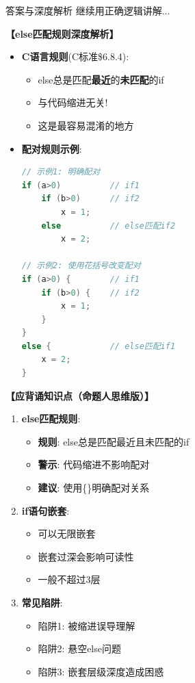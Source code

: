 \documentclass[a4paper,12pt]{article}
\begin{document}
\begin{bluebox}{答案与深度解析}
	继续用正确逻辑讲解...

	\textbf{【else匹配规则深度解析】}

	\begin{itemize}[leftmargin=*, nosep]
		\item \textbf{C语言规则}(C标准\$6.8.4):
		      \begin{itemize}
			      \item else总是匹配\textbf{最近}的\textbf{未匹配}的if
			      \item 与代码缩进无关!
			      \item 这是最容易混淆的地方
		      \end{itemize}

		\item \textbf{配对规则示例}:
		      \begin{lstlisting}[language=C]
// 示例1: 明确配对
if (a>0)          // if1
    if (b>0)      // if2
        x = 1;
    else          // else匹配if2
        x = 2;

// 示例2: 使用花括号改变配对
if (a>0) {        // if1
    if (b>0) {    // if2
        x = 1;
    }
}
else {            // else匹配if1
    x = 2;
}
    \end{lstlisting}
	\end{itemize}

	\textbf{【应背诵知识点（命题人思维版）】}
	\begin{enumerate}[leftmargin=*, nosep]
		\item \textbf{else匹配规则}:
		      \begin{itemize}
			      \item \textbf{规则}: else总是匹配最近且未匹配的if
			      \item \textbf{警示}: 代码缩进不影响配对
			      \item \textbf{建议}: 使用\{\}明确配对关系
		      \end{itemize}

		\item \textbf{if语句嵌套}:
		      \begin{itemize}
			      \item 可以无限嵌套
			      \item 嵌套过深会影响可读性
			      \item 一般不超过3层
		      \end{itemize}

		\item \textbf{常见陷阱}:
		      \begin{itemize}
			      \item 陷阱1: 被缩进误导理解
			      \item 陷阱2: 悬空else问题
			      \item 陷阱3: 嵌套层级深度造成困惑
		      \end{itemize}
	\end{enumerate}


\end{bluebox}
\end{document}
